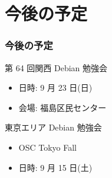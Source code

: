 \documentclass[cjk,dvipdfmx,10pt,%
hyperref={bookmarks=true,bookmarksnumbered=true,bookmarksopen=false,%
colorlinks=false,%
pdftitle={第 63 回 関西 Debian 勉強会},%
pdfauthor={倉敷・のがた・かわだ・佐々木},%
pdfsubject={資料},%
}]{beamer}
\begin{document}

\section{今後の予定}
\begin{frame}[fragile]
\frametitle{今後の予定}

\begin{block}{第 64 回関西 Debian 勉強会}
\begin{itemize}
  \item 日時: 9 月 23 日(日)
  \item 会場: 福島区民センター
\end{itemize}
\end{block}

\begin{block}{東京エリア Debian 勉強会}
  \begin{itemize}
  \item OSC Tokyo Fall
  \item 日時: 9 月 15 日(土)
  \end{itemize}
\end{block}

\end{frame}


\takahashi[50]{  }
\end{document}
